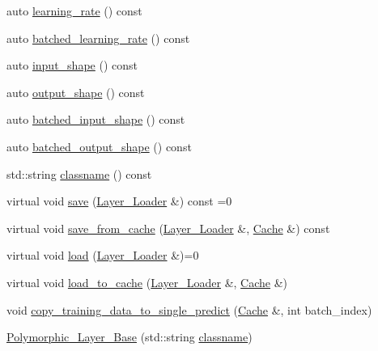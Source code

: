 \begin{DoxyCompactItemize}
\item 
auto \hyperlink{structbc_1_1nn_1_1Polymorphic__Layer__Base_a1b07bace4eb7d7255881d13358c29d26}{learning\+\_\+rate} () const
\item 
auto \hyperlink{structbc_1_1nn_1_1Polymorphic__Layer__Base_a4a592f412e5a7908293385d2e1f567d5}{batched\+\_\+learning\+\_\+rate} () const
\item 
auto \hyperlink{structbc_1_1nn_1_1Polymorphic__Layer__Base_ad62346d67a5ad6fbf84999e9254455b8}{input\+\_\+shape} () const
\item 
auto \hyperlink{structbc_1_1nn_1_1Polymorphic__Layer__Base_aa1e0b2c8f3de5576b73a27db6316b139}{output\+\_\+shape} () const
\item 
auto \hyperlink{structbc_1_1nn_1_1Polymorphic__Layer__Base_a362477a099ec16eeafcda0527ca711b2}{batched\+\_\+input\+\_\+shape} () const
\item 
auto \hyperlink{structbc_1_1nn_1_1Polymorphic__Layer__Base_a93154c06cdfce8282d48a114055d3e2a}{batched\+\_\+output\+\_\+shape} () const
\item 
std\+::string \hyperlink{structbc_1_1nn_1_1Polymorphic__Layer__Base_a3a63312d3100e6a6c31ba6bd16578aa7}{classname} () const
\item 
virtual void \hyperlink{structbc_1_1nn_1_1Polymorphic__Layer__Base_aa3a70d0ea45bdd0d9f9932d7fafe3d3e}{save} (\hyperlink{structbc_1_1nn_1_1Layer__Loader}{Layer\+\_\+\+Loader} \&) const =0
\item 
virtual void \hyperlink{structbc_1_1nn_1_1Polymorphic__Layer__Base_a7ec52a754f51ae14d655de2e7ae2e1a6}{save\+\_\+from\+\_\+cache} (\hyperlink{structbc_1_1nn_1_1Layer__Loader}{Layer\+\_\+\+Loader} \&, \hyperlink{structbc_1_1nn_1_1Cache}{Cache} \&) const
\item 
virtual void \hyperlink{structbc_1_1nn_1_1Polymorphic__Layer__Base_ab22a722386024a1329715e738d57814c}{load} (\hyperlink{structbc_1_1nn_1_1Layer__Loader}{Layer\+\_\+\+Loader} \&)=0
\item 
virtual void \hyperlink{structbc_1_1nn_1_1Polymorphic__Layer__Base_a2e1cbfa3ead765b5eddcdbb617b08ecd}{load\+\_\+to\+\_\+cache} (\hyperlink{structbc_1_1nn_1_1Layer__Loader}{Layer\+\_\+\+Loader} \&, \hyperlink{structbc_1_1nn_1_1Cache}{Cache} \&)
\item 
void \hyperlink{structbc_1_1nn_1_1Polymorphic__Layer__Base_a1233eecaa679d32a0203c13870cbe564}{copy\+\_\+training\+\_\+data\+\_\+to\+\_\+single\+\_\+predict} (\hyperlink{structbc_1_1nn_1_1Cache}{Cache} \&, int batch\+\_\+index)
\item 
\hyperlink{structbc_1_1nn_1_1Polymorphic__Layer__Base_a1b02e9a8e1b085c3b1eda984de21ce93}{Polymorphic\+\_\+\+Layer\+\_\+\+Base} (std\+::string \hyperlink{structbc_1_1nn_1_1Polymorphic__Layer__Base_a3a63312d3100e6a6c31ba6bd16578aa7}{classname})

\end{DoxyCompactItemize}
